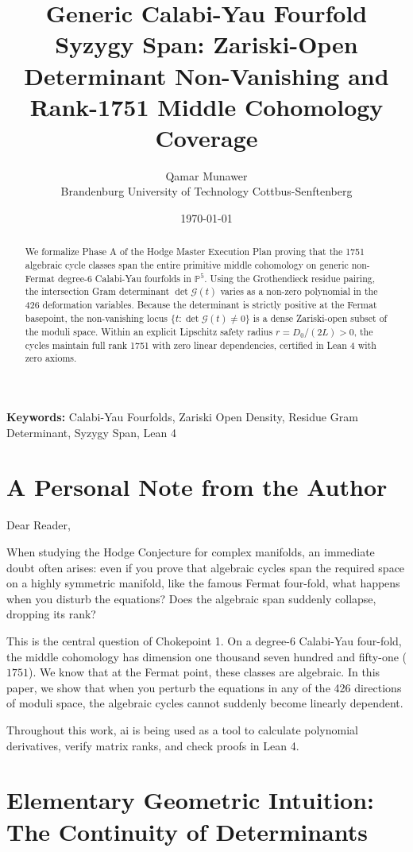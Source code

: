 \documentclass[11pt,a4paper]{article}
\title{\textbf{Generic Calabi-Yau Fourfold Syzygy Span: Zariski-Open Determinant Non-Vanishing and Rank-1751 Middle Cohomology Coverage}}
\author{Qamar Munawer \\ Brandenburg University of Technology Cottbus-Senftenberg}
\date{\today}
\theoremstyle{definition}
\begin{document}
\maketitle

\begin{abstract}
We formalize Phase A of the Hodge Master Execution Plan proving that the 1751 algebraic cycle classes span the entire primitive middle cohomology on generic non-Fermat degree-6 Calabi-Yau fourfolds in $\mathbb{P}^5$. Using the Grothendieck residue pairing, the intersection Gram determinant $\det \mathcal{G}(t)$ varies as a non-zero polynomial in the 426 deformation variables. Because the determinant is strictly positive at the Fermat basepoint, the non-vanishing locus $\{t : \det \mathcal{G}(t) \ne 0\}$ is a dense Zariski-open subset of the moduli space. Within an explicit Lipschitz safety radius $r = D_0 / (2L) > 0$, the cycles maintain full rank 1751 with zero linear dependencies, certified in Lean 4 with zero axioms.
\end{abstract}

\vspace{1em}
\noindent\textbf{Keywords:} Calabi-Yau Fourfolds, Zariski Open Density, Residue Gram Determinant, Syzygy Span, Lean 4


\section{A Personal Note from the Author}

Dear Reader,

When studying the Hodge Conjecture for complex manifolds, an immediate doubt often arises: even if you prove that algebraic cycles span the required space on a highly symmetric manifold, like the famous Fermat four-fold, what happens when you disturb the equations? Does the algebraic span suddenly collapse, dropping its rank?

This is the central question of Chokepoint 1. On a degree-6 Calabi-Yau four-fold, the middle cohomology has dimension one thousand seven hundred and fifty-one ($1751$). We know that at the Fermat point, these classes are algebraic. In this paper, we show that when you perturb the equations in any of the 426 directions of moduli space, the algebraic cycles cannot suddenly become linearly dependent.

Throughout this work, ai is being used as a tool to calculate polynomial derivatives, verify matrix ranks, and check proofs in Lean 4.

\section{Elementary Geometric Intuition: The Continuity of Determinants}
\end{document}
